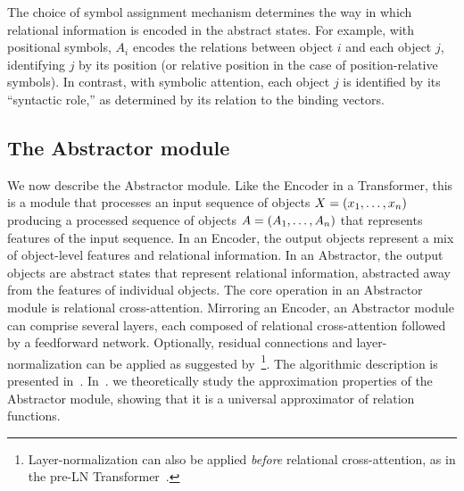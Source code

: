 The choice of symbol assignment mechanism determines the way in which relational information is encoded in the abstract states. For example, with positional symbols, $A_i$ encodes the relations between object $i$ and each object $j$, identifying $j$ by its position (or relative position in the case of position-relative symbols). In contrast, with symbolic attention, each object $j$ is identified by its ``syntactic role,'' as determined by its relation to the binding vectors.

\subsection{The Abstractor module}\label{ssec:abstractor_module}

We now describe the Abstractor module. Like the Encoder in a Transformer, this is a module that processes an input sequence of objects $X = \left(x_1, \ldots, x_n\right)$ producing a processed sequence of objects $A = \left(A_1, \ldots, A_n\right)$ that represents features of the input sequence. In an Encoder, the output objects represent a mix of object-level features and relational information. In an Abstractor, the output objects are abstract states that represent relational information, abstracted away from the features of individual objects. The core operation in an Abstractor module is relational cross-attention. Mirroring an Encoder, an Abstractor module can comprise several layers, each composed of relational cross-attention followed by a feedforward network. Optionally, residual connections and layer-normalization can be applied as suggested by~\citet{vaswani2017attention}\footnote{Layer-normalization can also be applied \textit{before} relational cross-attention, as in the pre-LN Transformer~\citep{xiong2020layer}.}. The algorithmic description is presented in~. In~. we theoretically study the approximation properties of the Abstractor module, showing that it is a universal approximator of relation functions.

